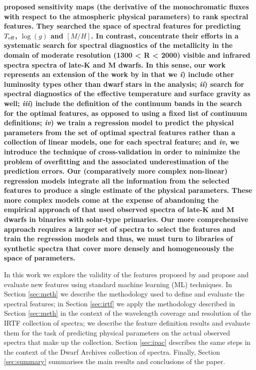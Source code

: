 {\bf \cite{cesetti} proposed sensitivity maps (the derivative of the
monochromatic fluxes with respect to the atmospheric physical
parameters) to rank spectral features. They searched the space of
spectral features for predicting $T_{\rm eff}$, $\log(g)$ and
$[M/H]$. In contrast, \cite{2013AJ....145...52M} concentrate their
efforts in a systematic search for spectral diagnostics of the
metallicity in the domain of moderate resolution (1300 < R < 2000)
visible and infrared spectra spectra of late-K and M dwarfs. In this
sense, our work represents an extension of the work
by \cite{2013AJ....145...52M} in that we {\it i}) include other
luminosity types other than dwarf stars in the analysis; {\it ii})
search for spectral diagnostics of the effective temperature and
surface gravity as well; {\it iii}) include the definition of the
continuum bands in the search for the optimal features, as opposed to
using a fixed list of continuum definitions; {\it iv}) we train a
regression model to predict the physical parameters from the set of
optimal spectral features rather than a collection of linear models,
one for each spectral feature; and {\it iv}, we introduce the
technique of cross-validation in order to minimize the problem of
overfitting \citep[see e.g.]{gelman2013bayesian} and the associated
underestimation of the prediction errors. Our (comparatively more
complex non-linear) regression models integrate all the information
from the selected features to produce a single estimate of the
physical parameters. These more complex models come at the expense of
abandoning the empirical approach of \cite{2013AJ....145...52M} that
used observed spectra of late-K and M dwarfs in binaries with
solar-type primaries. Our more comprehensive approach requires a
larger set of spectra to select the features and train the regression
models and thus, we must turn to libraries of synthetic spectra that
cover more densely and homogeneously the space of parameters.}

In this work we explore the validity of the features proposed
by \cite{cesetti} and propose and evaluate new features using standard
machine learning (ML) techniques. In Section \ref{sec:meth} we
describe the methodology used to define and evaluate the spectral
features; in Section \ref{sec:irtf} we apply the methodology described
in Section \ref{sec:meth} in the context of the wavelength coverage
and resolution of the IRTF collection of spectra; we describe the
feature definition results and evaluate them for the task of
predicting physical parameters on the actual observed spectra that
make up the collection. Section \ref{sec:ipac} describes the same
steps in the context of the Dwarf Archives collection of
spectra. Finally, Section \ref{sec:summary} summarises the main
results and conclusions of the paper.
